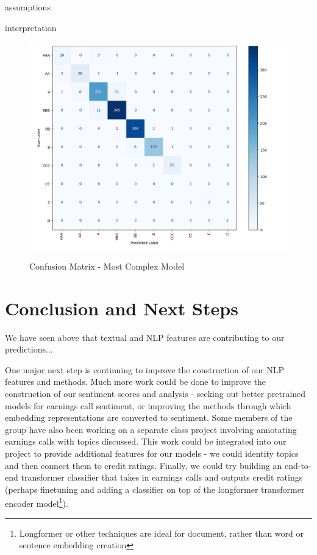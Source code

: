\documentclass{article}[11pt]
\begin{document}
    assumptions
    
    interpretation

    

    \begin{figure}[h!]
		\centering
        \caption{Confusion Matrix - Most Complex Model}
        \includegraphics[width=0.6\linewidth,keepaspectratio=true]{../Output/Modelling/Logistic Regression/rating_model_4/rating_model_4_confusion_matrix_no_title.png}
        \label{fig:most-complex-confusion-matrix}
	\end{figure}

    

    

    

    \section*{Conclusion and Next Steps}

    We have seen above that textual and NLP features are contributing to our predictions...

    One major next step is continuing to improve the construction of our NLP features and methods. Much more work could be done to improve the construction of our sentiment scores and analysis - seeking out better pretrained models for earnings call sentiment, or improving the methods through which embedding representations are converted to sentiment. Some members of the group have also been working on a separate class project involving annotating earnings calls with topics discussed. This work could be integrated into our project to provide additional features for our models - we could identity topics and then connect them to credit ratings. Finally, we could try building an end-to-end transformer classifier that takes in earnings calls and outputs credit ratings (perhaps finetuning and adding a classifier on top of the longformer \citep{beltagy_longformer_2020} transformer encoder model\footnote{Longformer or other techniques are ideal for document, rather than word or sentence embedding creation}).
\end{document}
